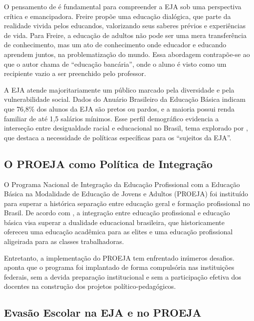 \documentclass[12pt,a4paper]{article}
\begin{document}
O pensamento de  é fundamental para compreender a EJA sob uma perspectiva crítica e emancipadora. Freire propõe uma educação dialógica, que parte da realidade vivida pelos educandos, valorizando seus saberes prévios e experiências de vida. Para Freire, a educação de adultos não pode ser uma mera transferência de conhecimento, mas um ato de conhecimento onde educador e educando aprendem juntos, na problematização do mundo. Essa abordagem contrapõe-se ao que o autor chama de ``educação bancária'', onde o aluno é visto como um recipiente vazio a ser preenchido pelo professor.

A EJA atende majoritariamente um público marcado pela diversidade e pela vulnerabilidade social. Dados do Anuário Brasileiro da Educação Básica \cite{todos2025} indicam que 76,8\% dos alunos da EJA são pretos ou pardos, e a maioria possui renda familiar de até 1,5 salários mínimos. Esse perfil demográfico evidencia a interseção entre desigualdade racial e educacional no Brasil, tema explorado por , que destaca a necessidade de políticas específicas para os ``sujeitos da EJA''.

\subsection{O PROEJA como Política de Integração}

O Programa Nacional de Integração da Educação Profissional com a Educação Básica na Modalidade de Educação de Jovens e Adultos (PROEJA) foi instituído para superar a histórica separação entre educação geral e formação profissional no Brasil. De acordo com , a integração entre educação profissional e educação básica visa superar a dualidade educacional brasileira, que historicamente ofereceu uma educação acadêmica para as elites e uma educação profissional aligeirada para as classes trabalhadoras.

Entretanto, a implementação do PROEJA tem enfrentado inúmeros desafios.  aponta que o programa foi implantado de forma compulsória nas instituições federais, sem a devida preparação institucional e sem a participação efetiva dos docentes na construção dos projetos político-pedagógicos.

\subsection{Evasão Escolar na EJA e no PROEJA}
\end{document}
